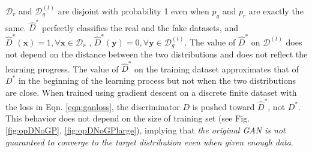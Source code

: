 \documentclass{article} %
\begin{document}
$\mathcal{D}_r$ and $\mathcal{D}_g^{(t)}$ are disjoint with probability 1 even when $p_g$ and $p_r$ are exactly the same. $\hat{D}^*$ perfectly classifies the real and the fake datasets, and
$\hat{D}^*(\bm x) = 1, \forall \bm x \in \mathcal{D}_r$
, $\hat{D}^*(\bm y) = 0, \forall \bm y \in \mathcal{D}_g^{(t)}$.
The value of $\hat{D}^*$ on $\mathcal{D}^{(t)}$ does not depend on the distance between the two distributions and does not reflect the learning progress. 
The value of $\hat{D}^*$ on the training dataset approximates that of $D^*$ in the beginning of the learning process but not when the two distributions are close.
When trained using gradient descent on a discrete finite dataset with the loss in Eqn. \ref{eqn:ganloss}, the discriminator $D$ is pushed toward $\hat{D}^*$, not $D^*$. This behavior does not depend on the size of training set (see Fig. \ref{fig:opDNoGP}, \ref{fig:opDNoGPlarge}), implying that \emph{the original GAN is not guaranteed to converge to the target distribution even when given enough data}.
\end{document}
